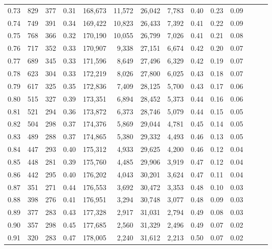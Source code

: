 \begin{tabular}{rrrrrrrrrrrrrr}
0.73 &    829 &  377 &  0.31 &  168,673 &   11,572 &  26,042 &   7,783 &  0.40 &  0.23 &      0.09 \\
0.74 &    749 &  391 &  0.34 &  169,422 &   10,823 &  26,433 &   7,392 &  0.41 &  0.22 &      0.09 \\
0.75 &    768 &  366 &  0.32 &  170,190 &   10,055 &  26,799 &   7,026 &  0.41 &  0.21 &      0.08 \\
0.76 &    717 &  352 &  0.33 &  170,907 &    9,338 &  27,151 &   6,674 &  0.42 &  0.20 &      0.07 \\
0.77 &    689 &  345 &  0.33 &  171,596 &    8,649 &  27,496 &   6,329 &  0.42 &  0.19 &      0.07 \\
0.78 &    623 &  304 &  0.33 &  172,219 &    8,026 &  27,800 &   6,025 &  0.43 &  0.18 &      0.07 \\
0.79 &    617 &  325 &  0.35 &  172,836 &    7,409 &  28,125 &   5,700 &  0.43 &  0.17 &      0.06 \\
0.80 &    515 &  327 &  0.39 &  173,351 &    6,894 &  28,452 &   5,373 &  0.44 &  0.16 &      0.06 \\
0.81 &    521 &  294 &  0.36 &  173,872 &    6,373 &  28,746 &   5,079 &  0.44 &  0.15 &      0.05 \\
0.82 &    504 &  298 &  0.37 &  174,376 &    5,869 &  29,044 &   4,781 &  0.45 &  0.14 &      0.05 \\
0.83 &    489 &  288 &  0.37 &  174,865 &    5,380 &  29,332 &   4,493 &  0.46 &  0.13 &      0.05 \\
0.84 &    447 &  293 &  0.40 &  175,312 &    4,933 &  29,625 &   4,200 &  0.46 &  0.12 &      0.04 \\
0.85 &    448 &  281 &  0.39 &  175,760 &    4,485 &  29,906 &   3,919 &  0.47 &  0.12 &      0.04 \\
0.86 &    442 &  295 &  0.40 &  176,202 &    4,043 &  30,201 &   3,624 &  0.47 &  0.11 &      0.04 \\
0.87 &    351 &  271 &  0.44 &  176,553 &    3,692 &  30,472 &   3,353 &  0.48 &  0.10 &      0.03 \\
0.88 &    398 &  276 &  0.41 &  176,951 &    3,294 &  30,748 &   3,077 &  0.48 &  0.09 &      0.03 \\
0.89 &    377 &  283 &  0.43 &  177,328 &    2,917 &  31,031 &   2,794 &  0.49 &  0.08 &      0.03 \\
0.90 &    357 &  298 &  0.45 &  177,685 &    2,560 &  31,329 &   2,496 &  0.49 &  0.07 &      0.02 \\
0.91 &    320 &  283 &  0.47 &  178,005 &    2,240 &  31,612 &   2,213 &  0.50 &  0.07 &      0.02 \\

\end{tabular}
